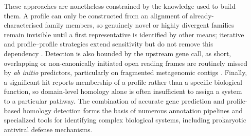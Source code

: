These approaches are nonetheless constrained by the knowledge used to build them.
A profile can only be constructed from an alignment of already-characterised
family members, so genuinely novel or highly divergent families remain invisible
until a first representative is identified by other means; iterative and
profile--profile strategies extend sensitivity but do not remove this dependency
\cite{remmert2012hhblits}. Detection is also bounded by the upstream gene call,
as short, overlapping or non-canonically initiated open reading frames are
routinely missed by \textit{ab initio} predictors, particularly on fragmented
metagenomic contigs \cite{sberro2019small}. Finally, a significant hit reports
membership of a profile rather than a specific biological function, so
domain-level homology alone is often insufficient to assign a system to a
particular pathway. The combination of accurate gene prediction and profile-based homology detection forms the basis of numerous annotation pipelines and specialized tools for identifying complex biological systems, including prokaryotic antiviral defense mechanisms. 










